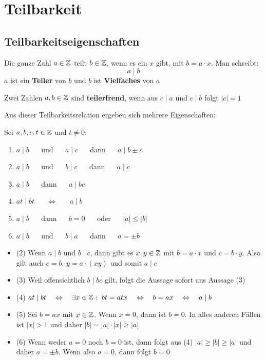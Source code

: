 \documentclass[main.tex]{subfiles}
\begin{document}
\section{Teilbarkeit}
\subsection{Teilbarkeitseigenschaften}

\begin{Definition}
	Die ganze Zahl $a\in\mathbb{Z}$ teilt $b\in\mathbb{Z}$, wenn es ein $x$ gibt, mit $b=a\cdot x$. Man schreibt:
	$$a \mid b$$
	$a$ ist ein \textbf{Teiler} von $b$ und $b$ ist \textbf{Vielfaches} von $a$

	Zwei Zahlen $a,b\in\mathbb{Z}$  sind \textbf{teilerfrend}, wenn aus $ c \mid  a  $ und $c\mid b$ folgt $|c| =1$
\end{Definition}

\begin{Theorem}
	Aus dieser Teilbarkeitsrelation ergeben sich mehrere Eigenschaften:
	
	Sei $a,b,c,t\in\mathbb{Z}$ und $t\neq0$:
	\begin{enumerate}
		\item $a \mid b$ $\quad$ und $\quad$ $a \mid c$ $\quad$ dann $\quad$ $a \mid b \pm c$
		\item $a \mid b$ $\quad$ und $\quad$ $b \mid c$ $\quad$ dann $\quad$ $a \mid c$
		\item $a \mid b$ $\quad$ dann $\quad$ $a \mid bc$
		\item $at \mid bt$ $\quad$ $\Leftrightarrow$ $\quad$ $a \mid b$
		\item $a \mid b$ $\quad$ dann $\quad$ $b=0$ $\quad$ oder $\quad$ $|a| \leq |b|$
		\item $a \mid b$ $\quad$ und $\quad$ $b\mid a$ $\quad$ dann $\quad$ $a=\pm b$
	\end{enumerate}
\end{Theorem}

\begin{Beweis}
	\begin{itemize}
		\item (2) \quad Wenn $a \mid b$ und $b \mid c$, dann gibt es $x,y\in\mathbb{Z}$ mit $b=a\cdot x$ und $c=b\cdot y$. Also gilt auch $c=b\cdot y=a\cdot(xy)$ und somit $a\mid c$\\
		\item (3) \quad Weil offensichtlich $b\mid bc$ gilt, folgt die Aussage sofort aus Aussage (3) \\
		\item (4)  \quad $at\mid bt\quad \Leftrightarrow\quad \exists x \in \mathbb{Z} : \, \, bt=atx \quad\Leftrightarrow \quad b=ax \quad\Leftrightarrow \quad a\mid b$ \\
		\item (5) \quad Sei $b=ax$ mit $x\in\mathbb{Z}$. Wenn $x=0$, dann ist $b=0$. In alles anderen Fällen ist $|x| >1$ und daher $|b|  = |a|  \cdot |x|  \geq |a| $
		\item (6) \quad Wenn weder $a=0$ noch $b=0$ ist, dann folgt aus (4) $|a| \geq|b| \geq|a| $ und daher $a=\pm b$. Wenn also  $a=0$, dann folgt $b=0$
	\end{itemize}
\end{Beweis}
\end{document}
